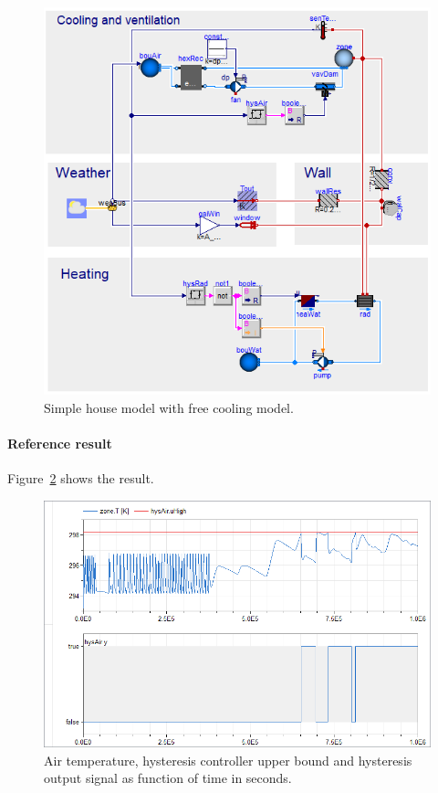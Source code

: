 \documentclass[10pt,a4paper]{article}
\begin{document}
\begin{figure}[h!]
\centering
\includegraphics[scale=0.65]{simpleHouse.png}
\caption{Simple house model with free cooling model.}
\label{fig:freeCoolingModel}
\end{figure} 


\paragraph{Reference result}
Figure~\ref{fig:res6} shows the result.



\begin{figure}
\centering
\includegraphics[scale=0.7]{result6.png}
\caption{Air temperature, hysteresis controller upper bound and hysteresis output signal as function of time in seconds.}
\label{fig:res6}
\end{figure}
\end{document}
